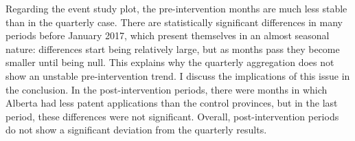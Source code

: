 \documentclass[../main.tex]{subfiles}
\begin{document}
Regarding the event study plot, the pre-intervention months are much less stable than in the quarterly case. There are statistically significant differences in many periods before January 2017, which present themselves in an almost seasonal nature: differences start being relatively large, but as months pass they become smaller until being null. This explains why the quarterly aggregation does not show an unstable pre-intervention trend. I discuss the implications of this issue in the conclusion. In the post-intervention periods, there were months in which Alberta had less patent applications than the control provinces, but in the last period, these differences were not significant. Overall, post-intervention periods do not show a significant deviation from the quarterly results.
\end{document}
